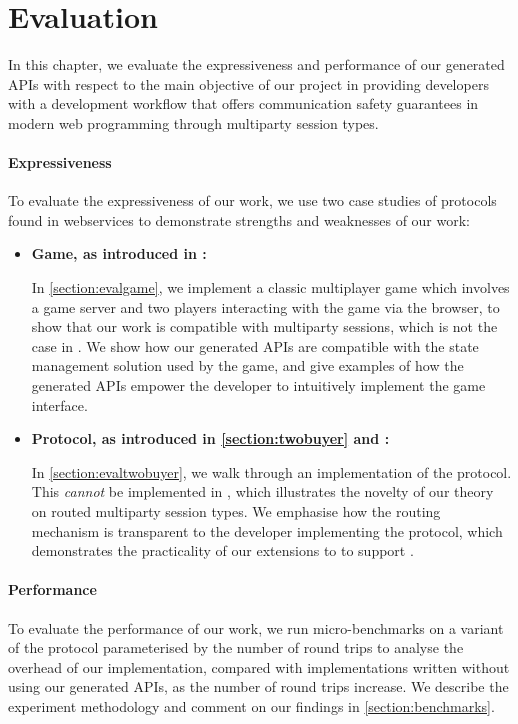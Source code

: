 \chapter{Evaluation}
\label{chap:eval}

In this chapter, we
evaluate the expressiveness
and performance of our generated APIs
with respect to the main objective of
our project in
providing
developers with a development workflow
that offers communication safety guarantees in modern
web programming through multiparty session types.

\subsubsection{Expressiveness}
To evaluate the expressiveness
of our work,
we use two case studies
of protocols found in webservices
to demonstrate strengths and weaknesses
of our work:

\begin{itemize}

\item
\textbf{ Game, as introduced
in \cite{PLACES2020}:}

In \cref{section:evalgame},
we implement a classic multiplayer game which involves a game server
and two players interacting with the game via the browser,
to show that our work is compatible with multiparty sessions,
which is not the case in \cite{MVU2020,Exceptional}.
We show how our generated APIs are compatible with the
state management solution used by the game, and give examples of 
how the generated APIs empower the developer to intuitively 
implement the game interface.

\item
\textbf{ Protocol, as introduced in 
\cref{section:twobuyer} and \cite{JACM2016,MPAST}:}

In \cref{section:evaltwobuyer},
we walk through an implementation of the 
protocol. This \textit{cannot} be implemented in
\cite{PureScript2019,MVU2020,Exceptional}, 
which illustrates the novelty
of our \newtheory theory on routed multiparty session types.
We emphasise how the routing mechanism is transparent to the
developer implementing the protocol, which demonstrates
the practicality of our extensions to \codegen to support
\newtheory.

\end{itemize}

\subsubsection{Performance}
To evaluate the performance of our work,
we run micro-benchmarks
on a variant of the 
protocol parameterised by the number
of round trips
to analyse the overhead of our implementation,
compared with implementations written
without using our generated APIs,
as the number of round trips increase.
We describe the experiment methodology
and comment on our findings in \cref{section:benchmarks}.

